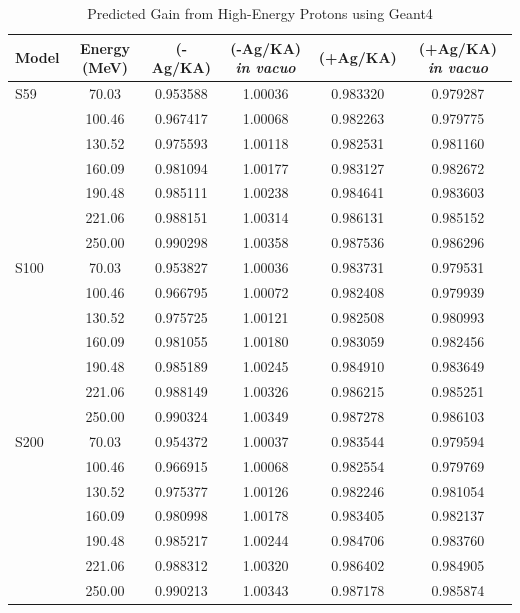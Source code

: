 \documentclass{mc2015}
\begin{document}
\begin{table}
  \centering
  \caption{Predicted Gain from High-Energy Protons using Geant4}
  \begin{tabular}{lccccc}
    \toprule
    Model & Energy (MeV) & (-Ag/KA) & (-Ag/KA) \emph{in vacuo} & (+Ag/KA) & (+Ag/KA) \emph{in vacuo} \\
    \midrule
    S59 & 70.03  & \num{0.953588} & \num{1.00036} & \num{0.983320} & \num{0.979287} \\
        & 100.46 & \num{0.967417} & \num{1.00068} & \num{0.982263} & \num{0.979775} \\
        & 130.52 & \num{0.975593} & \num{1.00118} & \num{0.982531} & \num{0.981160} \\
        & 160.09 & \num{0.981094} & \num{1.00177} & \num{0.983127} & \num{0.982672} \\
        & 190.48 & \num{0.985111} & \num{1.00238} & \num{0.984641} & \num{0.983603} \\
        & 221.06 & \num{0.988151} & \num{1.00314} & \num{0.986131} & \num{0.985152} \\
        & 250.00 & \num{0.990298} & \num{1.00358} & \num{0.987536} & \num{0.986296} \\
    \midrule
    S100 & 70.03 & \num{0.953827} & \num{1.00036} & \num{0.983731} & \num{0.979531} \\
        & 100.46 & \num{0.966795} & \num{1.00072} & \num{0.982408} & \num{0.979939} \\
        & 130.52 & \num{0.975725} & \num{1.00121} & \num{0.982508} & \num{0.980993} \\
        & 160.09 & \num{0.981055} & \num{1.00180} & \num{0.983059} & \num{0.982456} \\
        & 190.48 & \num{0.985189} & \num{1.00245} & \num{0.984910} & \num{0.983649} \\
        & 221.06 & \num{0.988149} & \num{1.00326} & \num{0.986215} & \num{0.985251} \\
        & 250.00 & \num{0.990324} & \num{1.00349} & \num{0.987278} & \num{0.986103} \\
    \midrule
    S200 & 70.03 & \num{0.954372} & \num{1.00037} & \num{0.983544} & \num{0.979594} \\
        & 100.46 & \num{0.966915} & \num{1.00068} & \num{0.982554} & \num{0.979769} \\
        & 130.52 & \num{0.975377} & \num{1.00126} & \num{0.982246} & \num{0.981054} \\
        & 160.09 & \num{0.980998} & \num{1.00178} & \num{0.983405} & \num{0.982137} \\
        & 190.48 & \num{0.985217} & \num{1.00244} & \num{0.984706} & \num{0.983760} \\
        & 221.06 & \num{0.988312} & \num{1.00320} & \num{0.986402} & \num{0.984905} \\
        & 250.00 & \num{0.990213} & \num{1.00343} & \num{0.987178} & \num{0.985874} \\
    \bottomrule
  \end{tabular}
  \label{tab:geant4_data}
\end{table}
\end{document}
